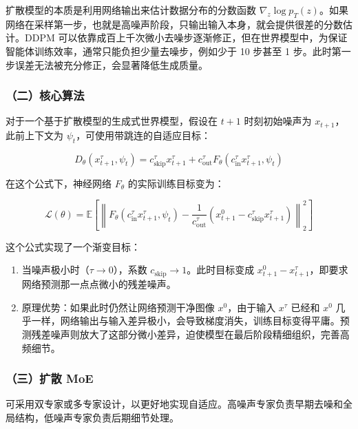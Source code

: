 扩散模型的本质是利用网络输出来估计数据分布的分数函数 \(\nabla_z\log p_T(z)\)。如果网络在采样第一步，也就是高噪声阶段，只输出输入本身，就会提供很差的分数估计。DDPM 可以依靠成百上千次微小去噪步逐渐修正，但在世界模型中，为保证智能体训练效率，通常只能负担少量去噪步，例如少于 10 步甚至 1 步。此时第一步误差无法被充分修正，会显著降低生成质量。

\hypertarget{ux4e8cux6838ux5fc3ux7b97ux6cd5}{%
\subsubsection{（二）核心算法}\label{ux4e8cux6838ux5fc3ux7b97ux6cd5}}

对于一个基于扩散模型的生成式世界模型，假设在 \(t+1\) 时刻初始噪声为 \(x_{t+1}\)，此前上下文为 \(\psi_t\)，可使用带跳连的自适应目标：

\[
D_\theta(x_{t+1}^{\tau},\psi_t)
=c_{\mathrm{skip}}^\tau x_{t+1}^{\tau}
+c_{\mathrm{out}}^\tau F_\theta(c_{\mathrm{in}}^\tau x_{t+1}^{\tau},\psi_t)
\]

在这个公式下，神经网络 \(F_\theta\) 的实际训练目标变为：

\[
\mathcal{L}(\theta)=
\mathbb{E}\left[
\left\|
F_\theta(c_{\mathrm{in}}^\tau x_{t+1}^{\tau},\psi_t) -
\frac{1}{c_{\mathrm{out}}^\tau}
\left(x_{t+1}^{0}-c_{\mathrm{skip}}^\tau x_{t+1}^{\tau}\right)
\right\|_2^2
\right]
\]

这个公式实现了一个渐变目标：

\begin{enumerate}
\def\labelenumi{\arabic{enumi}.}
\tightlist
\item
  当噪声极小时（\(\tau\to 0\)），系数 \(c_{\mathrm{skip}}\to 1\)。此时目标变成 \(x_{t+1}^0-x_{t+1}^{\tau}\)，即要求网络预测那一点点微小的残差噪声。
\item
  原理优势：如果此时仍然让网络预测干净图像 \(x^0\)，由于输入 \(x^\tau\) 已经和 \(x^0\) 几乎一样，网络输出与输入差异极小，会导致梯度消失，训练目标变得平庸。预测残差噪声则放大了这部分微小差异，迫使模型在最后阶段精细组织，完善高频细节。
\end{enumerate}

\hypertarget{ux4e09ux6269ux6563-moe}{%
\subsubsection{（三）扩散 MoE}\label{ux4e09ux6269ux6563-moe}}

可采用双专家或多专家设计，以更好地实现自适应。高噪声专家负责早期去噪和全局结构，低噪声专家负责后期细节处理。

